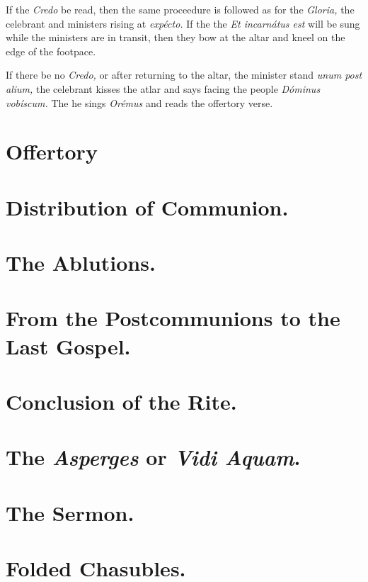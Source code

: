 \documentclass[letterpaper, twocolumn]{article}
\begin{document}
	\rubric If the \textit{Credo} be read, then the same proceedure is followed
	as for the \textit{Gloria,} the celebrant and ministers rising at
	\textit{expécto.} If the the \textit{Et incarnátus est} will be sung while
	the ministers are in transit, then they bow at the altar and kneel on the
	edge of the footpace.

	\rubric If there be no \textit{Credo,} or after returning to the altar, the
	minister stand \textit{unum post alium,} the celebrant kisses the atlar and
	says facing the people \textit{Dóminus vobíscum.} The he sings
	\textit{Orémus} and reads the offertory verse.

	\section{Offertory}

	\rubric 

	\section{Distribution of Communion.}

	\section{The Ablutions.}

	\section{From the Postcommunions to the Last Gospel.}

	\section{Conclusion of the Rite.}

	\section{The \textit{Asperges} or \textit{Vidi Aquam}.}

	\section{The Sermon.}

	\section{Folded Chasubles.}
\end{document}
